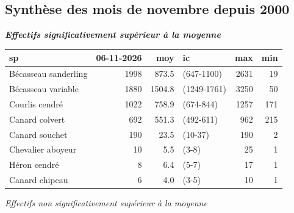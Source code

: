 \documentclass[
]{article}
\newcounter{none} %
\begin{document}
\newpage

\subsection{Synthèse des mois de novembre depuis
2000}\label{synthuxe8se-des-mois-de-novembre-depuis-2000}

\textbf{\emph{Effectifs significativement supérieur à la moyenne}}

{\def\LTcaptype{none} %
\begin{longtable}[]{@{}lrrlrr@{}}
\toprule\noalign{}
sp & 06-11-2026 & moy & ic & max & min \\
\midrule\noalign{}
\endhead
\bottomrule\noalign{}
\endlastfoot
Bécasseau sanderling & 1998 & 873.5 & (647-1100) & 2631 & 19 \\
Bécasseau variable & 1880 & 1504.8 & (1249-1761) & 3250 & 50 \\
Courlis cendré & 1022 & 758.9 & (674-844) & 1257 & 171 \\
Canard colvert & 692 & 551.3 & (492-611) & 962 & 215 \\
Canard souchet & 190 & 23.5 & (10-37) & 190 & 2 \\
Chevalier aboyeur & 10 & 5.5 & (3-8) & 25 & 1 \\
Héron cendré & 8 & 6.4 & (5-7) & 17 & 1 \\
Canard chipeau & 6 & 4.0 & (3-5) & 10 & 1 \\
\end{longtable}
}

\emph{Effectifs non significativement supérieur à la moyenne}
\end{document}
